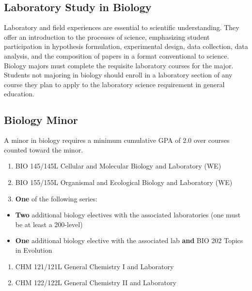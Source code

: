 \documentclass[
  letterpaper,
]{scrbook}
\providecommand{\tightlist}{%
  \setlength{\itemsep}{0pt}\setlength{\parskip}{0pt}}
\begin{document}
\subsection{Laboratory Study in
Biology}\label{laboratory-study-in-biology}

Laboratory and field experiences are essential to scientific
understanding. They offer an introduction to the processes of science,
emphasizing student participation in hypothesis formulation,
experimental design, data collection, data analysis, and the composition
of papers in a format conventional to science. Biology majors must
complete the requisite laboratory courses for the major. Students not
majoring in biology should enroll in a laboratory section of any course
they plan to apply to the laboratory science requirement in general
education.

\subsection{Biology Minor}\label{biology-minor}

A minor in biology requires a minimum cumulative GPA of 2.0 over courses
counted toward the minor.

\begin{enumerate}
\def\labelenumi{\arabic{enumi}.}
\tightlist
\item
  BIO 145/145L Cellular and Molecular Biology and Laboratory (WE)\\
\item
  BIO 155/155L Organismal and Ecological Biology and Laboratory (WE)\\
\item
  \textbf{One} of the following series:\\
\end{enumerate}

\begin{itemize}
\tightlist
\item
  \textbf{Two} additional biology electives with the associated
  laboratories (one must be at least a 200-level)\\
\item
  \textbf{One} additional biology elective with the associated lab
  \textbf{and} BIO 202 Topics in Evolution\\
\end{itemize}

\begin{enumerate}
\def\labelenumi{\arabic{enumi}.}
\setcounter{enumi}{3}
\tightlist
\item
  CHM 121/121L General Chemistry I and Laboratory\\
\item
  CHM 122/122L General Chemistry II and Laboratory
\end{enumerate}
\end{document}
